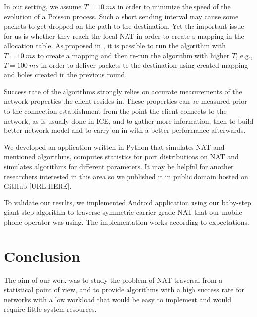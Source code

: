 \documentclass{acm_proc_article-sp}
\begin{document}
In our setting, we assume $T=10~ms$ in order to minimize the speed of the evolution of a Poisson process.
Such a short sending interval may cause some packets to get dropped on the path to the destination. Yet the 
important issue for us is whether they reach the local NAT in order to create a mapping in the allocation table. As proposed 
in \citep{Wang:2006:RSN:1156422.1156550}, it is possible to run the algorithm with $T=10~ms$ to create a mapping
and then re-run the algorithm with higher $T$, e.g., $T=100~ms$ in order to deliver packets to the destination
using created mapping and holes created in the previous round.

Success rate of the algorithms strongly relies on accurate measurements of the network 
properties the client resides in. These properties can be measured prior to the connection establishment 
from the point the client connects to the network, as is usually done in ICE, and to gather 
more information, then to build better network model and to carry on in with a better performance afterwards.

% 

We developed an application written in Python that simulates NAT and mentioned algorithms, computes
statistics for port distributions on NAT and simulates algorithms for different parameters. It
may be helpful for another researchers interested in this area so we published it in public domain
hosted on GitHub [URL:HERE].

To validate our results, we implemented Android application using our baby-step giant-step algorithm
to traverse symmetric carrier-grade NAT that our mobile phone operator was using. The implementation
works according to expectations.

\section{Conclusion}
The aim of our work was to study the problem of NAT traversal from a statistical point of view,
and to provide algorithms with a high success rate for networks with a low workload that would be easy to 
implement and would require little system resources.
\end{document}
